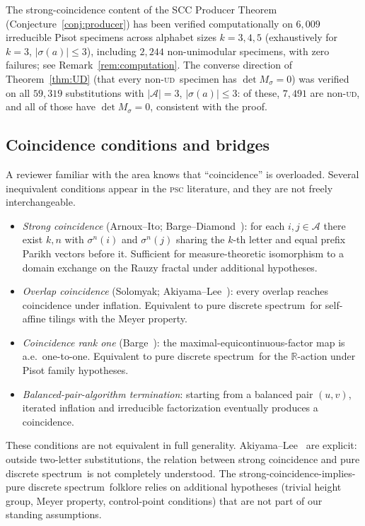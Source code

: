 \documentclass[11pt]{article}
\theoremstyle{plain}
\theoremstyle{definition}
\theoremstyle{remark}
\newcommand{\PSC}{\textsc{psc}}
\newcommand{\UD}{\textsc{ud}}
\newcommand{\PDS}{pure discrete spectrum}
\newcommand{\R}{\mathbb{R}}
\newcommand{\A}{\mathcal{A}}
\begin{document}
The strong-coincidence content of the SCC Producer Theorem (Conjecture~\ref{conj:producer}) has been verified computationally on $6{,}009$ irreducible Pisot specimens across alphabet sizes $k=3,4,5$ (exhaustively for $k=3$, $|\sigma(a)|\le 3$), including $2{,}244$ non-unimodular specimens, with zero failures; see Remark~\ref{rem:computation}. The converse direction of Theorem~\ref{thm:UD} (that every non-\UD\ specimen has $\det M_\sigma=0$) was verified on all $59{,}319$ substitutions with $|\A|=3$, $|\sigma(a)|\le 3$: of these, $7{,}491$ are non-\UD, and all of those have $\det M_\sigma=0$, consistent with the proof.

\subsection{Coincidence conditions and bridges}\label{sec:bridges}

A reviewer familiar with the area knows that ``coincidence'' is overloaded. Several inequivalent conditions appear in the \PSC{} literature, and they are not freely interchangeable.
\begin{itemize}[leftmargin=*]
\item \emph{Strong coincidence} (Arnoux--Ito; Barge--Diamond~\cite{BD}): for each $i,j\in\A$ there exist $k,n$ with $\sigma^n(i)$ and $\sigma^n(j)$ sharing the $k$-th letter and equal prefix Parikh vectors before it. Sufficient for measure-theoretic isomorphism to a domain exchange on the Rauzy fractal under additional hypotheses.
\item \emph{Overlap coincidence} (Solomyak; Akiyama--Lee~\cite{AL}): every overlap reaches coincidence under inflation. Equivalent to \PDS\ for self-affine tilings with the Meyer property.
\item \emph{Coincidence rank one} (Barge~\cite{Barge2016}): the maximal-equicontinuous-factor map is a.e.\ one-to-one. Equivalent to \PDS\ for the $\R$-action under Pisot family hypotheses.
\item \emph{Balanced-pair-algorithm termination}: starting from a balanced pair $(u,v)$, iterated inflation and irreducible factorization eventually produces a coincidence.
\end{itemize}

These conditions are not equivalent in full generality. Akiyama--Lee~\cite{AkiyamaLee2014} are explicit: outside two-letter substitutions, the relation between strong coincidence and \PDS\ is not completely understood. The strong-coincidence-implies-\PDS\ folklore relies on additional hypotheses (trivial height group, Meyer property, control-point conditions) that are not part of our standing assumptions.
\end{document}

